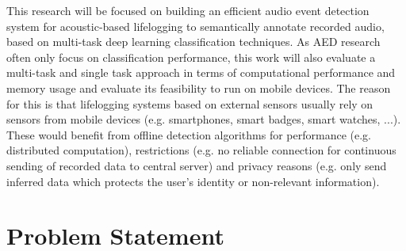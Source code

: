 This research will be focused on building an efficient audio event detection system for acoustic-based lifelogging to semantically annotate recorded audio, based on multi-task deep learning classification techniques. As AED research often only focus on classification performance, this work will also evaluate a multi-task and single task approach in terms of computational performance and memory usage and evaluate its feasibility to run on mobile devices. The reason for this is that lifelogging systems based on external sensors usually rely on sensors from mobile devices (e.g. smartphones, smart badges, smart watches, ...). These would benefit from offline detection algorithms for performance (e.g. distributed computation), restrictions (e.g. no reliable connection for continuous sending of recorded data to central server) and privacy reasons (e.g. only send inferred data which protects the user's identity or non-relevant information).








\section{Problem Statement}

